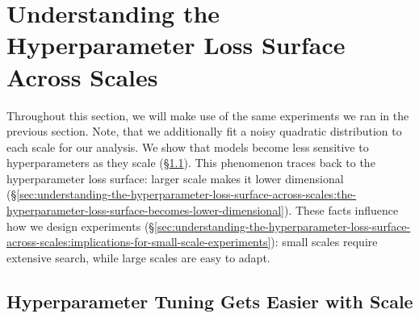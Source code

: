 \section{Understanding the Hyperparameter Loss Surface Across Scales}
\label{sec:understanding-the-hyperparameter-loss-surface-across-scales}

Throughout this section, we will make use of the same experiments we ran in the previous section. Note, that we additionally fit a noisy quadratic distribution to each scale for our analysis. 
%
We show that models become less sensitive to hyperparameters as they scale (\S\ref{sec:understanding-the-hyperparameter-loss-surface-across-scales:hyperparameter-tuning-gets-easier-with-scale}). This phenomenon traces back to the hyperparameter loss surface: larger scale makes it lower dimensional (\S\ref{sec:understanding-the-hyperparameter-loss-surface-across-scales:the-hyperparameter-loss-surface-becomes-lower-dimensional}). These facts influence how we design experiments (\S\ref{sec:understanding-the-hyperparameter-loss-surface-across-scales:implications-for-small-scale-experiments}): small scales require extensive search, while large scales are easy to adapt.

\subsection{Hyperparameter Tuning Gets Easier with Scale}
\label{sec:understanding-the-hyperparameter-loss-surface-across-scales:hyperparameter-tuning-gets-easier-with-scale}


